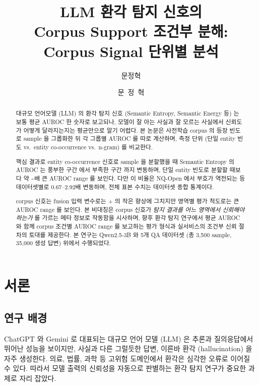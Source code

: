 \documentclass[oneside,ko,under]{snuthesis}
\title{LLM 환각 탐지 신호의\\%
Corpus Support 조건부 분해:\\%
Corpus Signal 단위별 분석}
\author{문정혁}
\author*{문~정~혁}
\begin{document}
\makefrontcover
\makeapproval

\cleardoublepage
{}

\begin{abstract}
대규모 언어모델 (LLM) 의 환각 탐지 신호 (Semantic Entropy, Semantic Energy 등) 는 보통 평균 AUROC 한 숫자로 보고되나, 모델이 잘 아는 사실과 잘 모르는 사실에서 신뢰도가 어떻게 달라지는지는 평균만으로 알기 어렵다. 본 논문은 사전학습 corpus 의 등장 빈도로 sample 을 그룹화한 뒤 각 그룹별 AUROC 를 따로 계산하며, 측정 단위 (단일 entity 빈도 vs.\ entity co-occurrence vs.\ n-gram) 를 비교한다.

핵심 결과로 entity co-occurrence 신호로 sample 을 분할했을 때 Semantic Entropy 의 AUROC 는 풍부한 구간 \HeadlineEntityPairSEHigh{} 에서 부족한 구간 \HeadlineEntityPairSELow{} 까지 변동하며, 단일 entity 빈도로 분할할 때보다 약 \HeadlineRatioRangeLow{}\textasciitilde{}\HeadlineRatioRangeHigh{}배 큰 AUROC range 를 보인다. 다만 이 비율은 NQ-Open 에서 부호가 역전되는 등 데이터셋별로 0.67--2.92배 변동하며, 전체 표본 수치는 데이터셋 종합 통계이다.

corpus 신호는 fusion 입력 변수로는 +\HeadlineCorpusLiftGBM{} 의 작은 향상에 그치지만 영역별 평가 척도로는 큰 AUROC range 를 보인다. 본 비대칭은 corpus 신호가 \emph{탐지 결과를 어느 영역에서 신뢰해야 하는가} 를 가르는 메타 정보로 작동함을 시사하며, 향후 환각 탐지 연구에서 평균 AUROC 와 함께 corpus 조건별 AUROC range 를 보고하는 평가 형식과 실서비스의 조건부 신뢰 절차의 토대를 제공한다. 본 연구는 Qwen2.5-3B 와 5개 QA 데이터셋 (총 3{,}500 sample, 35{,}000 생성 답변) 위에서 수행되었다.
\end{abstract}

\tableofcontents
\listoftables
\listoffigures

\cleardoublepage
{}


\chapter{서론}{\label{ch:intro}}

\section{연구 배경}

ChatGPT 와 Gemini 로 대표되는 대규모 언어 모델 (LLM) 은 추론과 질의응답에서 뛰어난 성능을 보이지만, 사실과 다른 그럴듯한 답변, 이른바 환각 (hallucination) 을 자주 생성한다\cite{huang2025survey, maynez2020faithfulness}. 의료, 법률, 과학 등 고위험 도메인에서 환각은 심각한 오류로 이어질 수 있다. 따라서 모델 출력의 신뢰성을 자동으로 판별하는 환각 탐지 연구가 중요한 과제로 자리 잡았다.
\end{document}

